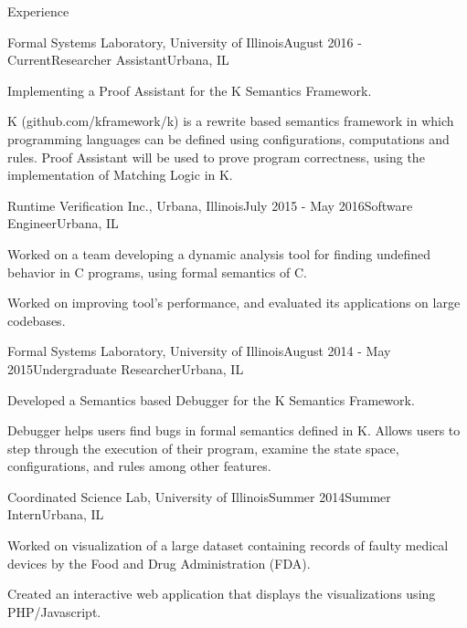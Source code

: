 \documentclass{resume} %
\begin{document}
\begin{rSection}{Experience}

\begin{rSubsection}{Formal Systems Laboratory, University of Illinois}{August 2016 - Current}{Researcher Assistant}{Urbana, IL}
\item Implementing a Proof Assistant for the K Semantics Framework.
\item K (github.com/kframework/k) is a rewrite based semantics framework in which programming
languages can be defined using configurations, computations and rules. Proof Assistant will be used to prove program correctness, using the implementation of Matching Logic in K.
\end{rSubsection}

\begin{rSubsection}{Runtime Verification Inc., Urbana, Illinois}{July 2015 - May 2016}{Software Engineer}{Urbana, IL}
\item Worked on a team developing a dynamic analysis tool for finding undefined behavior in C programs, using formal semantics of C.
\item Worked on improving tool's performance, and evaluated its applications on large codebases.
\end{rSubsection}

\begin{rSubsection}{Formal Systems Laboratory, University of Illinois}{August 2014 - May 2015}{Undergraduate Researcher}{Urbana, IL}
\item Developed a Semantics based Debugger for the K Semantics Framework.
\item Debugger helps users find bugs in formal semantics defined in K. Allows users to step
through the execution of their program, examine the state space, configurations, and rules
among other features.
\end{rSubsection}


\begin{rSubsection}{Coordinated Science Lab, University of Illinois}{Summer 2014}{Summer Intern}{Urbana, IL}
\item Worked on visualization of a large dataset containing records of faulty medical devices by the Food and Drug Administration (FDA).
\item Created an interactive web application that displays the visualizations using PHP/Javascript.
\end{rSubsection}


\end{rSection}
\end{document}
